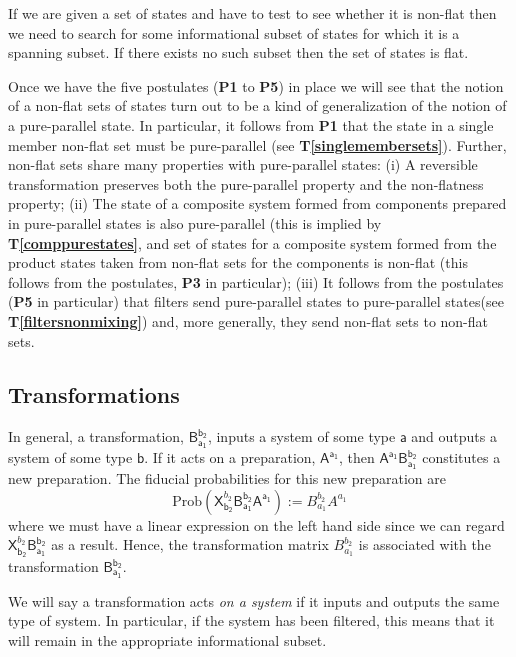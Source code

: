 \documentclass[10pt]{article}
\begin{document}
If we are given a set of states and have to test to see whether it is non-flat then we need to search for some informational subset of states for which it is a spanning subset.  If there exists no such subset then the set of states is flat.

Once we have the five postulates ({\bf P1} to {\bf P5}) in place we will see that the notion of a non-flat sets of states turn out to be a kind of generalization of the notion of a pure-parallel state.   In particular, it follows from {\bf P1} that the state in a single member non-flat set must be pure-parallel (see {\bf T\ref{singlemembersets}}).  Further, non-flat sets share many properties with pure-parallel states: (i) A reversible transformation preserves both the pure-parallel property and the non-flatness property; (ii) The state of a composite system formed from components prepared in pure-parallel states is also pure-parallel (this is implied by {\bf T\ref{comppurestates}}, and set of states for a composite system formed from the product states taken from non-flat sets for the components is non-flat (this follows from the postulates, {\bf P3} in particular); (iii) It follows from the postulates ({\bf P5} in particular) that filters send pure-parallel states to pure-parallel states(see {\bf T\ref{filtersnonmixing}}) and, more generally, they send non-flat sets to non-flat sets.



\subsection{Transformations}   \label{transformationssection}


In general, a transformation, $\mathsf{ B_{a_1}^{b_2}}$, inputs a system of some type $\mathsf a$ and outputs a system of some type $\mathsf b$.   If it acts on a preparation, $\mathsf{A^{a_1}}$, then $\mathsf{A^{a_1}B_{a_1}^{b_2}}$ constitutes a new preparation.  The fiducial probabilities for this new preparation are
\begin{equation}
\text{Prob}(\mathsf{X}_\mathsf{b_2}^{b_2}\mathsf{B_{a_1}^{b_2} A^{a_1}}) := B_{a_1}^{b_2} A^{a_1}
\end{equation}
where we must have a linear expression on the left hand side since we can regard $\mathsf{X}_\mathsf{b_2}^{b_2}\mathsf{B_{a_1}^{b_2}}$ as a result.  Hence, the transformation matrix $B_{a_1}^{b_2}$ is associated with the transformation $\mathsf{ B_{a_1}^{b_2}}$.

We will say a transformation acts \emph{on a system} if it inputs and outputs the same type of system.  In particular, if the system has been filtered, this means that it will remain in the appropriate informational subset.
\end{document}
